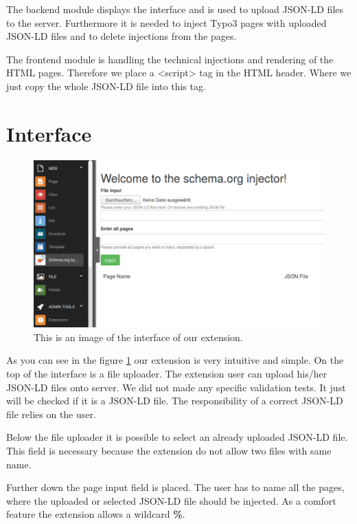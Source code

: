 \documentclass{article}
\begin{document}
The backend module displays the interface and is used to upload JSON-LD files to the server.
Furthermore it is needed to inject Typo3 pages with uploaded JSON-LD files and to delete injections from the pages.

The frontend module is handling the technical injections and rendering of the HTML pages.
Therefore we place a <script> tag in the HTML header. Where we just copy the whole JSON-LD file into this tag.



\section{Interface}
\begin{figure}[ht]
	\centering
	\includegraphics[width=1.0\textwidth]{backend_module.png}
	\caption{This is an image of the interface of our extension.}
	\label{interface}
\end{figure}

As you can see in the figure \ref{interface} our extension is very intuitive and simple. On the top of the interface is a file uploader. The extension user can upload his/her JSON-LD files onto server. We did not made any specific validation tests. It just will be checked if it is a JSON-LD file. The responsibility of a correct JSON-LD file relies on the user.

Below the file uploader it is possible to select an already uploaded JSON-LD file. This field is necessary because the extension do not allow two files with same name.

Further down the page input field is placed. The user has to name all the pages, where the uploaded or selected JSON-LD file should be injected. As a comfort feature the extension allows a wildcard \textbf{\%}.
\end{document}
